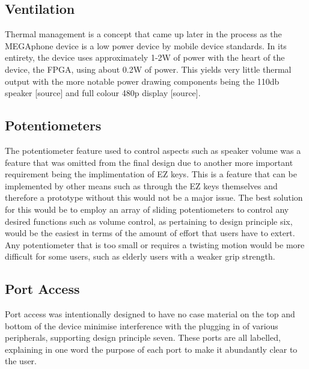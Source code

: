 \subsection{Ventilation}

Thermal management is a concept that came up later in the process as the MEGAphone device is a low power device by mobile device standards.
In its entirety, the device uses approximately 1-2W of power with the heart of the device, the FPGA, using about 0.2W of power.
This yields very little thermal output with the more notable power drawing components being the 110db speaker [source] and full colour 480p display [source].

\subsection{Potentiometers}

The potentiometer feature used to control aspects such as speaker volume was a feature that was omitted from the final design due to another more important requirement being the implimentation of EZ keys.
This is a feature that can be implemented by other means such as through the EZ keys themselves and therefore a prototype without this would not be a major issue.
The best solution for this would be to employ an array of sliding potentiometers to control any desired functions such as volume control, as pertaining to design principle six, would be the easiest in terms of the amount of effort that users have to extert.
Any potentiometer that is too small or requires a twisting motion would be more difficult for some users, such as elderly users with a weaker grip strength.

\subsection{Port Access}

Port access was intentionally designed to have no case material on the top and bottom of the device minimise interference with the plugging in of various peripherals, supporting design principle seven.
These ports are all labelled, explaining in one word the purpose of each port to make it abundantly clear to the user.

